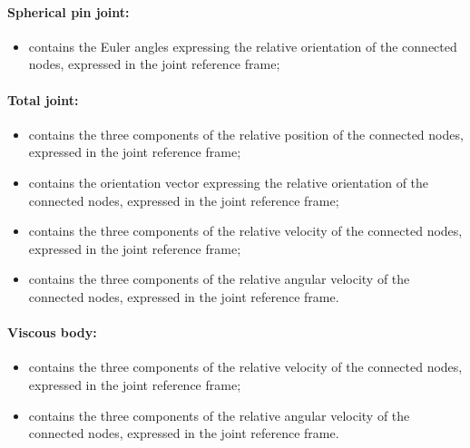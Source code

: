 \paragraph{Spherical pin joint:}
\begin{itemize}
\item {} contains the Euler angles 
  expressing the relative orientation of the connected nodes, expressed in 
  the joint reference frame;
\end{itemize}

\paragraph{Total joint:}
\begin{itemize}
\item {} contains the three components of
  the relative position of the connected nodes, expressed in the joint 
  reference frame;
\item {} contains the orientation vector
  expressing the relative orientation of the connected nodes, expressed in 
  the joint reference frame;
\item {} contains the three components of
  the relative velocity of the connected nodes, expressed in the joint 
  reference frame;
\item {} contains the three components
  of the relative angular velocity of the connected nodes, expressed in 
  the joint reference frame.
\end{itemize}

\paragraph{Viscous body:}
\begin{itemize}
\item {} contains the three components of
  the relative velocity of the connected nodes, expressed in the joint 
  reference frame;
\item {} contains the three components
  of the relative angular velocity of the connected nodes, expressed in 
  the joint reference frame.
\end{itemize}



